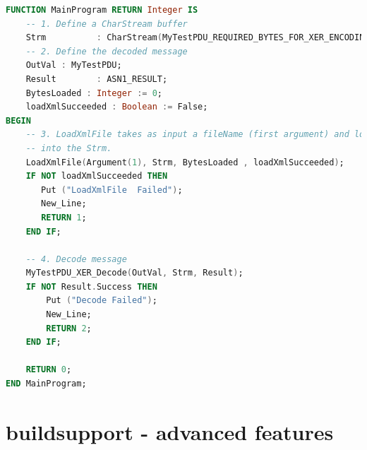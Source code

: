\documentclass[11pt]{book}
\begin{document}
\begin{lstlisting}[language=Ada]
FUNCTION MainProgram RETURN Integer IS
    -- 1. Define a CharStream buffer
    Strm          : CharStream(MyTestPDU_REQUIRED_BYTES_FOR_XER_ENCODING);
    -- 2. Define the decoded message
    OutVal : MyTestPDU;
    Result        : ASN1_RESULT;
    BytesLoaded : Integer := 0;
    loadXmlSucceeded : Boolean := False;
BEGIN
    -- 3. LoadXmlFile takes as input a fileName (first argument) and loads the xml data
    -- into the Strm.
    LoadXmlFile(Argument(1), Strm, BytesLoaded , loadXmlSucceeded);
    IF NOT loadXmlSucceeded THEN
       Put ("LoadXmlFile  Failed");
       New_Line;
       RETURN 1;
    END IF;

    -- 4. Decode message
    MyTestPDU_XER_Decode(OutVal, Strm, Result);
    IF NOT Result.Success THEN
        Put ("Decode Failed");
        New_Line;
        RETURN 2;
    END IF;

    RETURN 0;
END MainProgram;
\end{lstlisting}


	  

\chapter{buildsupport - advanced features}
\end{document}
